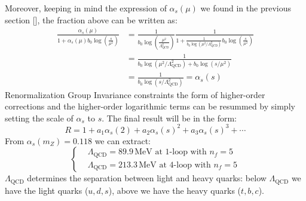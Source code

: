 \documentclass[../main.tex]{subfiles}
\begin{document}
Moreover, keeping in mind the expression of $\alpha_s(\mu)$ we found in the previous section [], the fraction above can be written as:
\begin{align*}
\frac{\alpha_s(\mu)}{1+\alpha_s(\mu)b_0\log\left(\frac{s}{\mu^2}\right)}&=\frac{1}{b_0\log\left(\frac{\mu^2}{\Lambda_{\text{QCD}}^2}\right)}\frac{1}{1+\frac{1}{b_0\log(\mu^2/\Lambda_{\text{QCD}}^2)}b_0\log\left(\frac{s}{\mu^2}\right)}\\
&=\frac{1}{b_0\log(\mu^2/\Lambda_{\text{QCD}}^2)+b_0\log(s/\mu^2)}\\
&=\frac{1}{b_0\log(s/\Lambda_{\text{QCD}}^2)}=\alpha_s(s)
\end{align*}
Renormalization Group Invariance constraints the form of higher-order corrections and the higher-order logarithmic terms can be resummed by simply setting the scale of $\alpha_s$ to $s$. The final result will be in the form:
\[
R=1+a_1\alpha_s(2)+a_2\alpha_s(s)^2+a_3\alpha_s(s)^3+\cdots
\]
From $\alpha_s(m_Z)=0.118$ we can extract:
\[
\left\{
\begin{aligned}
&\Lambda_{\text{QCD}}=89.9\,\text{MeV at 1-loop with $n_f=5$}\\
&\Lambda_{\text{QCD}}=213.3\,\text{MeV at 4-loop with $n_f=5$}
\end{aligned}
\right.
\]
$\Lambda_{\text{QCD}}$ determines the separation between light and heavy quarks: below $\Lambda_{\text{QCD}}$ we have the light quarks ($u, d, s$), above we have the heavy quarks ($t, b, c$).
\end{document}
